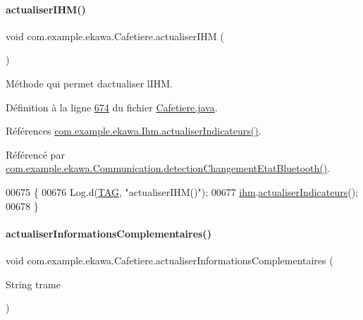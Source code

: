 \paragraph{\texorpdfstring{actualiser\+I\+H\+M()}{actualiserIHM()}}
{\footnotesize\ttfamily void com.\+example.\+ekawa.\+Cafetiere.\+actualiser\+I\+HM (\begin{DoxyParamCaption}{ }\end{DoxyParamCaption})}



Méthode qui permet d\textquotesingle{}actualiser l\textquotesingle{}I\+HM. 



Définition à la ligne \hyperlink{_cafetiere_8java_source_l00674}{674} du fichier \hyperlink{_cafetiere_8java_source}{Cafetiere.\+java}.



Références \hyperlink{_ihm_8java_source_l00855}{com.\+example.\+ekawa.\+Ihm.\+actualiser\+Indicateurs()}.



Référencé par \hyperlink{_communication_8java_source_l00078}{com.\+example.\+ekawa.\+Communication.\+detection\+Changement\+Etat\+Bluetooth()}.


\begin{DoxyCode}
00675     \{
00676         Log.d(\hyperlink{classcom_1_1example_1_1ekawa_1_1_cafetiere_aa0c1fd99a2508b06c462aea17034aa91}{TAG}, \textcolor{stringliteral}{"actualiserIHM()"});
00677         \hyperlink{classcom_1_1example_1_1ekawa_1_1_cafetiere_a7db4a63088834eda5f6a3e951611bf82}{ihm}.\hyperlink{classcom_1_1example_1_1ekawa_1_1_ihm_a2c3740dd5be20b3111b36649514fd41e}{actualiserIndicateurs}();
00678     \}
\end{DoxyCode}
\mbox{\label{classcom_1_1example_1_1ekawa_1_1_cafetiere_af968afecce6625f466b145a54e8b1d44}} 
\paragraph{\texorpdfstring{actualiser\+Informations\+Complementaires()}{actualiserInformationsComplementaires()}}
{\footnotesize\ttfamily void com.\+example.\+ekawa.\+Cafetiere.\+actualiser\+Informations\+Complementaires (\begin{DoxyParamCaption}\item[{String}]{trame }\end{DoxyParamCaption})\hspace{0.3cm}{\ttfamily [private]}}



